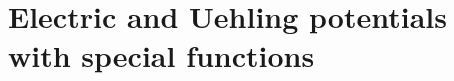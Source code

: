 \documentclass  [
  paper           = a4,
  BCOR            = 13mm, %
  twoside,
  fontsize        = 11pt, %
  DIV             = 12,   %
  chapterprefix,
  numbers         = noendperiod,
  headinclude     = true,
  footinclude     = false,
  headings        = big,
  headings        = openright,
  headsepline     = true,
  footsepline     = false,
  cleardoublepage = empty,
  titlepage       = true
]                                       {scrbook}
\begin{document}
  \chapter{Electric and Uehling potentials with special functions \label{app:pots}}    
    




  \cleardoublepage
  \backmatter

  
    
%    
%    
    \thispagestyle{plain}





  \cleardoublepage

  
    \thispagestyle{plain}


%  


%    
%    
\end{document}
